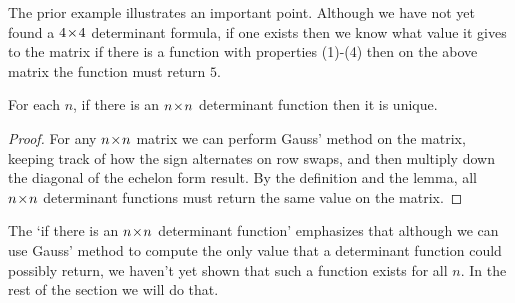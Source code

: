 The prior example illustrates an important point.
Although we have not yet found a $4 \! \times \! 4$ determinant formula,
if one exists then we know what value it gives to the matrix \Dash  
if there is a function with properties (1)-(4) then on the above 
matrix the function must return $5$.

\begin{lemma}
For each $n$, 
if there is an $n \! \times \! n$ determinant function then it is unique.
\end{lemma}

\begin{proof}
For any $n \! \times \! n$ matrix 
we can perform Gauss' method on the 
matrix, keeping track of how the sign alternates on row swaps, and then 
multiply down the diagonal of the echelon form result.
By the definition and the lemma,
all $n \! \times \! n$ determinant functions must return the same value on the matrix.
\end{proof}

The `if there is an $n \! \times \! n$ determinant function' 
emphasizes that
although we can
use Gauss' method to compute the only value that a determinant function 
could possibly return, 
we haven't yet shown that such a function exists for all $n$.
In the rest of the section we will do that.

